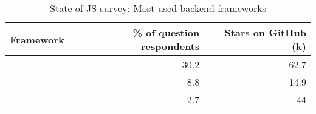 \begin{table}[ht]
\centering
\caption{State of JS survey: Most used backend frameworks \parencite{mostUsedBackendFrameworks22}}
\label{tab:backendFrameworksRanking}
\begin{tabular}[t]{|l|r|r|}
\toprule
Framework & \% of question respondents & Stars on GitHub (k)\\
\midrule
\cite{githubNest} & 30.2 & 62.7\\
\cite{githubFeathers} & 8.8 & 14.9\\
\cite{githubMeteor} & 2.7 & 44\\
\bottomrule
\end{tabular}
\end{table}

